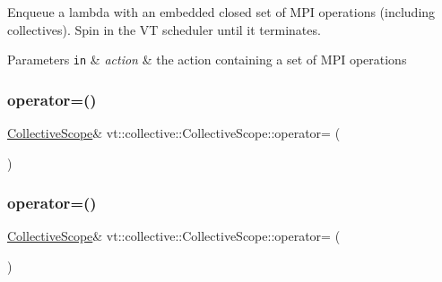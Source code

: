 Enqueue a lambda with an embedded closed set of M\+PI operations (including collectives). Spin in the VT scheduler until it terminates. 


\begin{DoxyParams}[1]{Parameters}
\mbox{\tt in}  & {\em action} & the action containing a set of M\+PI operations \\
\hline
\end{DoxyParams}
\mbox{\label{structvt_1_1collective_1_1_collective_scope_a4a756e93437119e20a72dfe0d9ede190}} 
\subsubsection{\texorpdfstring{operator=()}{operator=()}\hspace{0.1cm}{\footnotesize\ttfamily [1/2]}}
{\footnotesize\ttfamily \hyperlink{structvt_1_1collective_1_1_collective_scope}{Collective\+Scope}\& vt\+::collective\+::\+Collective\+Scope\+::operator= (\begin{DoxyParamCaption}\item[{\hyperlink{structvt_1_1collective_1_1_collective_scope}{Collective\+Scope} \&\&}]{ }\end{DoxyParamCaption})\hspace{0.3cm}{\ttfamily [delete]}}

\mbox{\label{structvt_1_1collective_1_1_collective_scope_ae211d02b75ae45834e25eb1cd8c2f7d0}} 
\subsubsection{\texorpdfstring{operator=()}{operator=()}\hspace{0.1cm}{\footnotesize\ttfamily [2/2]}}
{\footnotesize\ttfamily \hyperlink{structvt_1_1collective_1_1_collective_scope}{Collective\+Scope}\& vt\+::collective\+::\+Collective\+Scope\+::operator= (\begin{DoxyParamCaption}\item[{\hyperlink{structvt_1_1collective_1_1_collective_scope}{Collective\+Scope} const \&}]{ }\end{DoxyParamCaption})\hspace{0.3cm}{\ttfamily [delete]}}

